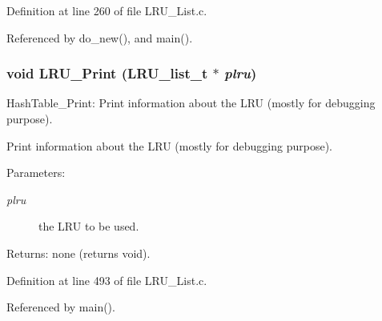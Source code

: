 Definition at line 260 of file LRU\_\-List.c.

Referenced by do\_\-new(), and main().
\subsubsection{\setlength{\rightskip}{0pt plus 5cm}void LRU\_\-Print (LRU\_\-list\_\-t $\ast$ {\em plru})}\label{group__LRUExportedFunctions_ga6}


Hash\-Table\_\-Print: Print information about the LRU (mostly for debugging purpose).

Print information about the LRU (mostly for debugging purpose).

\begin{Desc}
\item[Parameters:]
\begin{description}
\item[{\em plru}]the LRU to be used.\end{description}
\end{Desc}
\begin{Desc}
\item[Returns:]none (returns void). \end{Desc}


Definition at line 493 of file LRU\_\-List.c.

Referenced by main().